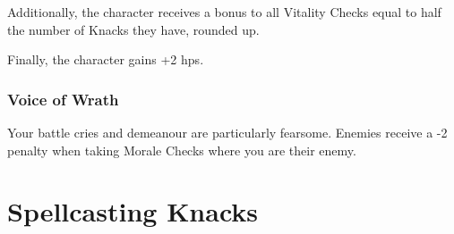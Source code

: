 \begin{multicols}{2}
Additionally, the character receives a bonus to all Vitality Checks equal to half the number of Knacks they have, rounded up.

Finally, the character gains +2 \glspl{hp}.

\subsubsection{Voice of Wrath}

Your battle cries and demeanour are particularly fearsome. Enemies receive a -2 penalty when taking Morale Checks where you are their enemy.

\end{multicols}

\section{Spellcasting Knacks}

